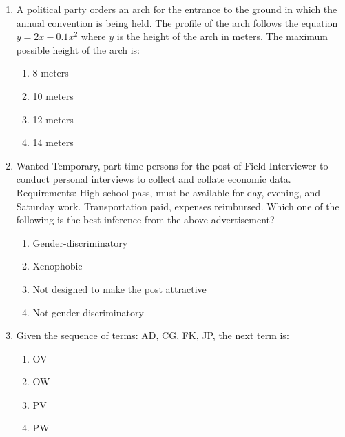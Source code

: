 \documentclass[journal]{IEEEtran}
\numberwithin{equation}{enumi}
\numberwithin{figure}{enumi}
\begin{document}
\begin{enumerate}[start=53]
\item A political party orders an arch for the entrance to the ground in which the annual convention is being held. The profile of the arch follows the equation $y = 2x - 0.1x^2$ where $y$ is the height of the arch in meters. The maximum possible height of the arch is:
    \begin{enumerate}
        \item 8 meters
        \item 10 meters
        \item 12 meters
        \item 14 meters
    \end{enumerate}

\item Wanted Temporary, part-time persons for the post of Field Interviewer to conduct personal interviews to collect and collate economic data. Requirements: High school pass, must be available for day, evening, and Saturday work. Transportation paid, expenses reimbursed.  
Which one of the following is the best inference from the above advertisement?
    \begin{enumerate}
        \item Gender-discriminatory
        \item Xenophobic
        \item Not designed to make the post attractive
        \item Not gender-discriminatory
    \end{enumerate}

\item Given the sequence of terms: AD, CG, FK, JP, the next term is:
    \begin{enumerate}
        \item OV
        \item OW
        \item PV
        \item PW
    \end{enumerate}

\end{enumerate}
\end{document}
